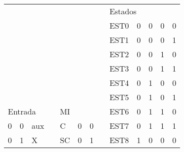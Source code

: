 \begin{longtable}{llllllll|lrrrr|}
\cline{9-13}
 &  &  &  &  &  &  &  & \multicolumn{5}{l|}{Estados} \\ \cline{9-13}
 &  &  &  &  &  &  &  & \multicolumn{1}{l|}{\cellcolor[HTML]{D9D9D9}EST0} & \multicolumn{1}{r|}{\cellcolor[HTML]{D9D9D9}0} & \multicolumn{1}{r|}{\cellcolor[HTML]{D9D9D9}0} & \multicolumn{1}{r|}{\cellcolor[HTML]{D9D9D9}0} & \cellcolor[HTML]{D9D9D9}0 \\ \cline{9-13}
 &  &  &  &  &  &  &  & \multicolumn{1}{l|}{EST1} & \multicolumn{1}{r|}{0} & \multicolumn{1}{r|}{0} & \multicolumn{1}{r|}{0} & 1 \\ \cline{9-13}
 &  &  &  &  &  &  &  & \multicolumn{1}{l|}{\cellcolor[HTML]{D9D9D9}EST2} & \multicolumn{1}{r|}{\cellcolor[HTML]{D9D9D9}0} & \multicolumn{1}{r|}{\cellcolor[HTML]{D9D9D9}0} & \multicolumn{1}{r|}{\cellcolor[HTML]{D9D9D9}1} & \cellcolor[HTML]{D9D9D9}0 \\ \cline{9-13}
 &  &  &  &  &  &  &  & \multicolumn{1}{l|}{EST3} & \multicolumn{1}{r|}{0} & \multicolumn{1}{r|}{0} & \multicolumn{1}{r|}{1} & 1 \\ \cline{9-13}
 &  &  &  &  &  &  &  & \multicolumn{1}{l|}{\cellcolor[HTML]{D9D9D9}EST4} & \multicolumn{1}{r|}{\cellcolor[HTML]{D9D9D9}0} & \multicolumn{1}{r|}{\cellcolor[HTML]{D9D9D9}1} & \multicolumn{1}{r|}{\cellcolor[HTML]{D9D9D9}0} & \cellcolor[HTML]{D9D9D9}0 \\ \cline{9-13}
 &  &  &  &  &  &  &  & \multicolumn{1}{l|}{EST5} & \multicolumn{1}{r|}{0} & \multicolumn{1}{r|}{1} & \multicolumn{1}{r|}{0} & 1 \\ \cline{1-3} \cline{5-7} \cline{9-13}
\multicolumn{3}{|l|}{Entrada} & \multicolumn{1}{l|}{} & \multicolumn{3}{l|}{MI} &  & \multicolumn{1}{l|}{\cellcolor[HTML]{D9D9D9}EST6} & \multicolumn{1}{r|}{\cellcolor[HTML]{D9D9D9}0} & \multicolumn{1}{r|}{\cellcolor[HTML]{D9D9D9}1} & \multicolumn{1}{r|}{\cellcolor[HTML]{D9D9D9}1} & \cellcolor[HTML]{D9D9D9}0 \\ \cline{1-3} \cline{5-7} \cline{9-13}
\multicolumn{1}{|r|}{\cellcolor[HTML]{CCCCCC}0} & \multicolumn{1}{r|}{\cellcolor[HTML]{CCCCCC}0} & \multicolumn{1}{l|}{\cellcolor[HTML]{CCCCCC}aux} & \multicolumn{1}{l|}{} & \multicolumn{1}{l|}{\cellcolor[HTML]{D9D9D9}C} & \multicolumn{1}{r|}{\cellcolor[HTML]{D9D9D9}0} & \multicolumn{1}{r|}{\cellcolor[HTML]{D9D9D9}0} &  & \multicolumn{1}{l|}{EST7} & \multicolumn{1}{r|}{0} & \multicolumn{1}{r|}{1} & \multicolumn{1}{r|}{1} & 1 \\ \cline{1-3} \cline{5-7} \cline{9-13}
\multicolumn{1}{|r|}{0} & \multicolumn{1}{r|}{1} & \multicolumn{1}{l|}{X} & \multicolumn{1}{l|}{} & \multicolumn{1}{l|}{SC} & \multicolumn{1}{r|}{0} & \multicolumn{1}{r|}{1} &  & \multicolumn{1}{l|}{\cellcolor[HTML]{D9D9D9}EST8} & \multicolumn{1}{r|}{\cellcolor[HTML]{D9D9D9}1} & \multicolumn{1}{r|}{\cellcolor[HTML]{D9D9D9}0} & \multicolumn{1}{r|}{\cellcolor[HTML]{D9D9D9}0} & \cellcolor[HTML]{D9D9D9}0 \\ \cline{1-3} \cline{5-7} \cline{9-13}

\end{longtable}

